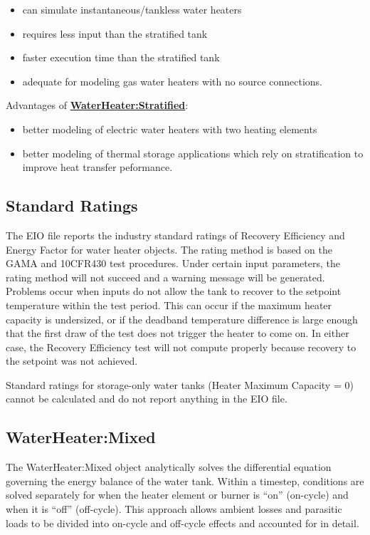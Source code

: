 \begin{itemize}
\item
  can simulate instantaneous/tankless water heaters
\item
  requires less input than the stratified tank
\item
  faster execution time than the stratified tank
\item
  adequate for modeling gas water heaters with no source connections.
\end{itemize}

Advantages of \textbf{\hyperref[waterheaterstratified]{WaterHeater:Stratified}}:

\begin{itemize}
\item
  better modeling of electric water heaters with two heating elements
\item
  better modeling of thermal storage applications which rely on stratification to improve heat transfer peformance.
\end{itemize}

\subsection{Standard Ratings}\label{standard-ratings}

The EIO file reports the industry standard ratings of Recovery Efficiency and Energy Factor for water heater objects. The rating method is based on the GAMA and 10CFR430 test procedures. Under certain input parameters, the rating method will not succeed and a warning message will be generated. Problems occur when inputs do not allow the tank to recover to the setpoint temperature within the test period. This can occur if the maximum heater capacity is undersized, or if the deadband temperature difference is large enough that the first draw of the test does not trigger the heater to come on. In either case, the Recovery Efficiency test will not compute properly because recovery to the setpoint was not achieved.

Standard ratings for storage-only water tanks (Heater Maximum Capacity = 0) cannot be calculated and do not report anything in the EIO file.

\subsection{WaterHeater:Mixed}\label{waterheatermixed}

The WaterHeater:Mixed object analytically solves the differential equation governing the energy balance of the water tank. Within a timestep, conditions are solved separately for when the heater element or burner is ``on'' (on-cycle) and when it is ``off'' (off-cycle). This approach allows ambient losses and parasitic loads to be divided into on-cycle and off-cycle effects and accounted for in detail.

